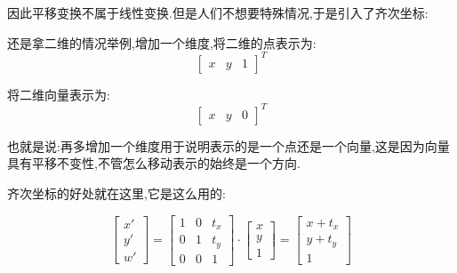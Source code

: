 \documentclass[UTF8,12pt]{ctexbook}
\begin{document}
{{{{        因此平移变换不属于线性变换.但是人们不想要特殊情况,于是引入了齐次坐标:

        还是拿二维的情况举例,增加一个维度,将二维的点表示为:
        $$\begin{bmatrix}
            x & y & 1
          \end{bmatrix}^T$$

        将二维向量表示为:
        $$\begin{bmatrix}
            x & y & 0
          \end{bmatrix}^T$$

        也就是说:再多增加一个维度用于说明表示的是一个点还是一个向量,这是因为向量具有平移不变性,不管怎么移动表示的始终是一个方向.

        齐次坐标的好处就在这里,它是这么用的:

        $$\begin{bmatrix}
            x\prime \\
            y\prime \\
            w\prime
          \end{bmatrix}
          =
          \begin{bmatrix}
            1 & 0 & t_x \\
            0 & 1 & t_y \\
            0 & 0 & 1
          \end{bmatrix}
          \cdot
          \begin{bmatrix}
            x \\
            y \\
            1
          \end{bmatrix}
          =
          \begin{bmatrix}
            x + t_x \\
            y + t_y \\
            1
          \end{bmatrix}
        $$

}}}}
\end{document}
